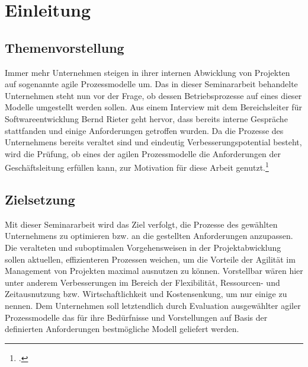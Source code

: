 \section{Einleitung}
\subsection{Themenvorstellung}
Immer mehr Unternehmen steigen in ihrer internen Abwicklung von Projekten auf sogenannte agile Prozessmodelle um. Das in dieser Seminararbeit behandelte Unternehmen steht nun vor der Frage, ob dessen Betriebsprozesse auf eines dieser Modelle umgestellt werden sollen. Aus einem Interview mit dem Bereichsleiter für Softwareentwicklung Bernd Rieter geht hervor, dass bereits interne Gespräche stattfanden und einige Anforderungen getroffen wurden. Da die Prozesse des Unternehmens bereits veraltet sind und eindeutig Verbesserungspotential besteht, wird die Prüfung, ob eines der agilen Prozessmodelle die Anforderungen der Geschäftsleitung erfüllen kann, zur Motivation für diese Arbeit genutzt.\footcite[Vgl.][]{interview}

\subsection{Zielsetzung}
Mit dieser Seminararbeit wird das Ziel verfolgt, die Prozesse des gewählten Unternehmens zu optimieren bzw. an die gestellten Anforderungen anzupassen. Die veralteten und suboptimalen Vorgehensweisen in der Projektabwicklung sollen aktuellen, effizienteren Prozessen weichen, um die Vorteile der Agilität im Management von Projekten maximal ausnutzen zu können. Vorstellbar wären hier unter anderem Verbesserungen im Bereich der Flexibilität, Ressourcen- und Zeitausnutzung bzw. Wirtschaftlichkeit und Kostensenkung, um nur einige zu nennen. Dem Unternehmen soll letztendlich durch Evaluation ausgewählter agiler Prozessmodelle das für ihre Bedürfnisse und Vorstellungen auf Basis der definierten Anforderungen bestmögliche Modell geliefert werden.


